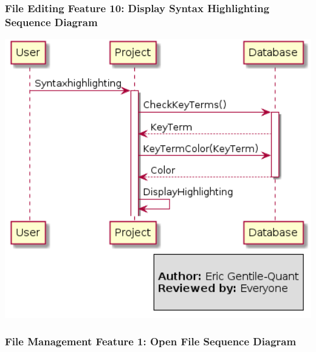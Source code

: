 \documentclass[twoside,letterpaper]{article}
\begin{document}
	\newpage
	
	\subsubsection[File Editing Feature 10: Display Syntax Highlighting Sequence Diagram]{\rmfamily\bfseries\color{black}
		File Editing Feature 10: Display Syntax Highlighting Sequence Diagram}
	\hypertarget{RefHeading22059017292}{}
	
	\bigskip
	
	\includegraphics[width=6.0in]{images/SequenceDiagrams/SyntaxHighlighting}
	
	\newpage
	
	\subsubsection[File Management Feature 1: Open File Sequence Diagram]{\rmfamily\bfseries\color{black}
		File Management Feature 1: Open File Sequence Diagram}
	\hypertarget{RefHeading22059017292}{}
	
	\bigskip
	
\end{document}

